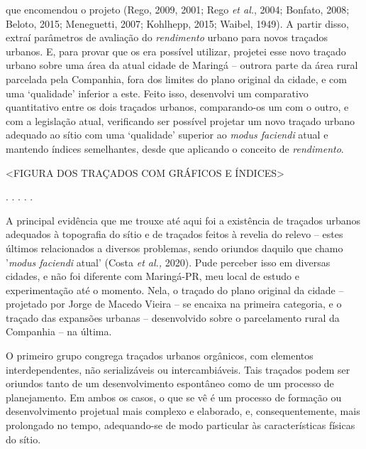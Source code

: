 \documentclass[]{report}
\begin{document}
	que encomendou o projeto (Rego, 2009, 2001; Rego \textit{et al.}, 2004; Bonfato, 2008; Beloto, 2015; Meneguetti, 2007; Kohlhepp, 2015; Waibel, 1949). A partir disso, extraí parâmetros de avaliação do \textit{rendimento} urbano para novos traçados urbanos. E, para provar que os era possível utilizar, projetei esse novo traçado urbano sobre uma área da atual cidade de Maringá – outrora parte da área rural parcelada pela Companhia, fora dos limites do plano original da cidade, e com uma `qualidade' inferior a este. Feito isso, desenvolvi um comparativo quantitativo entre os dois traçados urbanos, comparando-os um com o outro, e com a legislação atual, verificando ser possível projetar um novo traçado urbano adequado ao sítio com uma `qualidade' superior ao \textit{modus faciendi} atual e mantendo índices semelhantes, desde que aplicando o conceito de \textit{rendimento}.

	<FIGURA DOS TRAÇADOS COM GRÁFICOS E ÍNDICES>

	\begin{center}
		. . . . .
	\end{center}

	A principal evidência que me trouxe até aqui foi a existência de traçados urbanos adequados à topografia do sítio e de traçados feitos à revelia do relevo – estes últimos relacionados a diversos problemas, sendo oriundos daquilo que chamo '\textit{modus faciendi} atual' (Costa \textit{et al.,} 2020). Pude perceber isso em diversas cidades, e não foi diferente com Maringá-PR, meu local de estudo e experimentação até o momento. Nela, o traçado do plano original da cidade – projetado por Jorge de Macedo Vieira – se encaixa na primeira categoria, e o traçado das expansões urbanas – desenvolvido sobre o parcelamento rural da Companhia – na última. 

	O primeiro grupo congrega traçados urbanos orgânicos, com elementos interdependentes, não serializáveis ou intercambiáveis. Tais traçados podem ser oriundos tanto de um desenvolvimento espontâneo como de um processo de planejamento. Em ambos os casos, o que se vê é um processo de formação ou desenvolvimento projetual mais complexo e elaborado, e, consequentemente, mais prolongado no tempo, adequando-se de modo particular às características físicas do sítio. 
\end{document}
